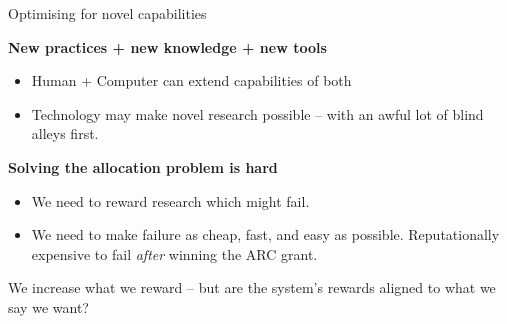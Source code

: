 \documentclass[aspectratio=1610, 11pt]{beamer} %
\begin{document}
\begin{frame}{Optimising for novel capabilities}

\textbf{New practices + new knowledge + new tools }
\begin{itemize}
    \item Human + Computer can extend capabilities of both
    \item Technology may make novel research possible -- with an awful lot of blind alleys first.
\end{itemize}

\textbf{Solving the allocation problem is hard}
\begin{itemize}
    \item We need to reward research which might fail.
    \item We need to make failure as cheap, fast, and easy as possible. Reputationally expensive to fail \textit{after} winning the ARC grant.
\end{itemize}

We increase what we reward -- but are the system's rewards aligned to what we say we want? \parencite{Beer2002-tl}
\end{frame}
\end{document}
